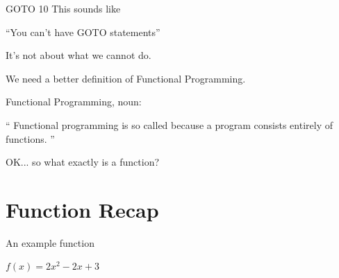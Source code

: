 \documentclass[mathserif]{beamer}
\begin{document}
\begin{frame}{GOTO 10}
    This sounds like
  \begin{exampleblock}{}
    {\Large ``You can't have GOTO statements''}
  \end{exampleblock}
  \vskip5mm
  \hspace*{}
\end{frame}

\begin{frame}{}

  \begin{center}
    {\Huge It's not about what we cannot do.}
  \end{center}

\end{frame}

\begin{frame}{}

  \begin{center}
    {\Huge We need a better definition of Functional Programming.}
  \end{center}

\end{frame}

\begin{frame}{Functional Programming, noun:}

\begin{exampleblock}{}
  {\Large ``
  Functional programming is so called because a program consists entirely of functions.
  ''}
  \vskip5mm
  \hspace*{}
\end{exampleblock}
\end{frame}

\begin{frame}{}

  {\Large OK... so what exactly is a function?}

\end{frame}

\section{Function Recap}

\begin{frame}{An example function}

  {\Huge $f(x) = 2x^2 - 2x + 3$}


\end{frame}
\end{document}
